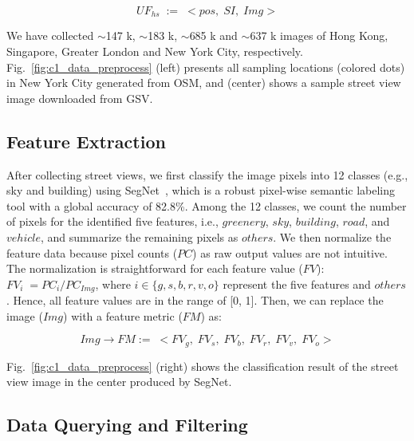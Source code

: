 \vspace*{-2mm}
\begin{equation}
\label{c1_eq_sv}
UF_{hs} \; := \; <pos, \; SI, \; Img>
\end{equation}

We have collected $\sim$147 k, $\sim$183 k, $\sim$685 k and $\sim$637 k images of Hong Kong, Singapore, Greater London and New York City, respectively.
Fig.~\ref{fig:c1_data_preprocess} (left) presents all sampling locations (colored dots) in New York City generated from OSM, and (center) shows a sample street view image downloaded from GSV.

\subsection{Feature Extraction}
\label{ssec:c1_feature}
After collecting street views, we first classify the image pixels into 12 classes (e.g., sky and building) using SegNet~\cite{Badrinarayanan_2015_segnet}, which is a robust pixel-wise semantic labeling tool with a global accuracy of 82.8\%.
Among the 12 classes, we count the number of pixels for the identified five features, i.e., $greenery$, $sky$, $building$, $road$, and $vehicle$, and summarize the remaining pixels as $others$.
We then normalize the feature data because pixel counts ($PC$) as raw output values are not intuitive.
The normalization is straightforward for each feature value ($FV$):
$ FV_i \; = {PC_i} / {PC_{Img}} $, where $i \in \{g, s, b, r, v, o\}$ represent the five features and $others$.
Hence, all feature values are in the range of [0, 1].
Then, we can replace the image ($Img$) with a feature metric ($FM$) as:

\vspace*{-2mm}
\begin{equation}
\label{c1_eq_fm}
Img \rightarrow FM := \; <FV_g, \; FV_s, \; FV_b, \; FV_r, \; FV_v, \; FV_o>
\end{equation}

Fig.~\ref{fig:c1_data_preprocess} (right) shows the classification result of the street view image in the center produced by SegNet.

\subsection{Data Querying and Filtering}
\label{ssec:c1_query}

